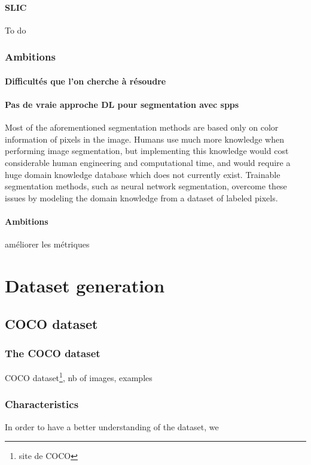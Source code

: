 \documentclass{article}
\begin{document}
            \paragraph{SLIC} To do

        \subsubsection{Ambitions}
                \paragraph{Difficultés que l'on cherche à résoudre}
                \paragraph{Pas de vraie approche DL pour segmentation avec spps} Most of the aforementioned segmentation methods are based only on color information of pixels in the image. Humans use much more knowledge when performing image segmentation, but implementing this knowledge would cost considerable human engineering and computational time, and would require a huge domain knowledge database which does not currently exist. Trainable segmentation methods, such as neural network segmentation, overcome these issues by modeling the domain knowledge from a dataset of labeled pixels.
                \paragraph{Ambitions}
                améliorer les métriques









\section{Dataset generation}
    \subsection{COCO dataset}
        \subsubsection{The COCO dataset}
        COCO dataset\footnote{site de COCO}, nb of images, examples

        \subsubsection{Characteristics}
        \label{par:charac}
        In order to have a better understanding of the dataset, we
\end{document}
